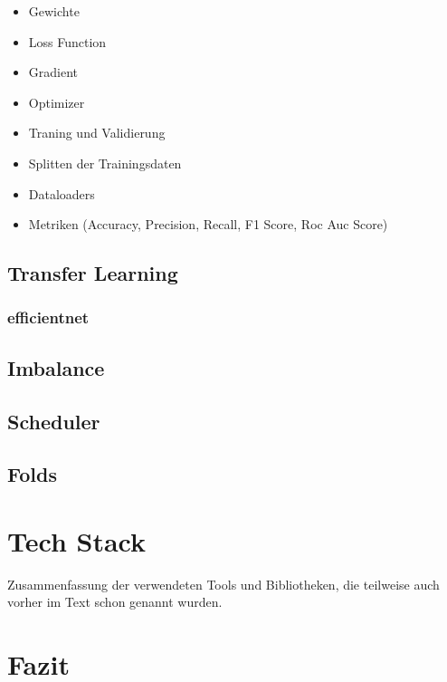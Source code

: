 \documentclass[11pt, a4paper]{article}
\begin{document}
\begin{itemize}
	\item Gewichte
	\item Loss Function
	\item Gradient
	\item Optimizer
	\item Traning und Validierung
	\item Splitten der Trainingsdaten
	\item Dataloaders
	\item Metriken (Accuracy, Precision, Recall, F1 Score, Roc Auc Score)
\end{itemize}

\subsection{Transfer Learning}

\subsubsection{efficientnet}

\subsection{Imbalance}

\subsection{Scheduler}

\subsection{Folds}

\section{Tech Stack}
Zusammenfassung der verwendeten Tools und Bibliotheken, die teilweise auch vorher im Text schon genannt wurden.

\section{Fazit}
\end{document}
